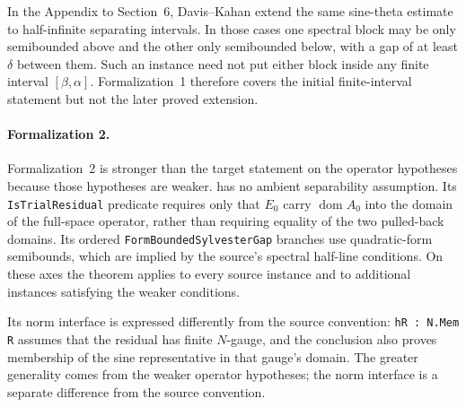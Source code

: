 \documentclass{article}
\newenvironment{nolinenumbers}{}{}
\begin{document}
In the Appendix to Section~6, Davis--Kahan extend the same sine-theta estimate
to half-infinite separating intervals.  In those cases one spectral block may be
only semibounded above and the other only semibounded below, with a gap of at
least $\delta$ between them.  Such an instance need not put either block inside
any finite interval $[\beta,\alpha]$.  Formalization~1 therefore covers the
initial finite-interval statement but not the later proved extension.

\begin{nolinenumbers}
\begin{minipage}{\linewidth}

\end{minipage}
\end{nolinenumbers}

\paragraph{Formalization 2.}
Formalization~2 is stronger than the target statement on the operator
hypotheses because those hypotheses are weaker.  
has no ambient separability assumption.  Its
\texttt{IsTrialResidual} predicate requires only that $E_0$ carry
$\operatorname{dom}A_0$ into the domain of the full-space operator, rather than
requiring equality of the two pulled-back domains.  Its ordered
\texttt{FormBoundedSylvesterGap} branches use quadratic-form semibounds, which
are implied by the source's spectral half-line conditions.  On these axes the
theorem applies to every source instance and to additional instances satisfying
the weaker conditions.

Its norm interface is expressed differently from the source convention:
\texttt{hR : N.Mem R} assumes that the residual has finite $N$-gauge, and the
conclusion also proves membership of the sine representative in that gauge's
domain.  The greater generality comes from the weaker operator hypotheses;
the norm interface is a separate difference from the source convention.
\end{document}
